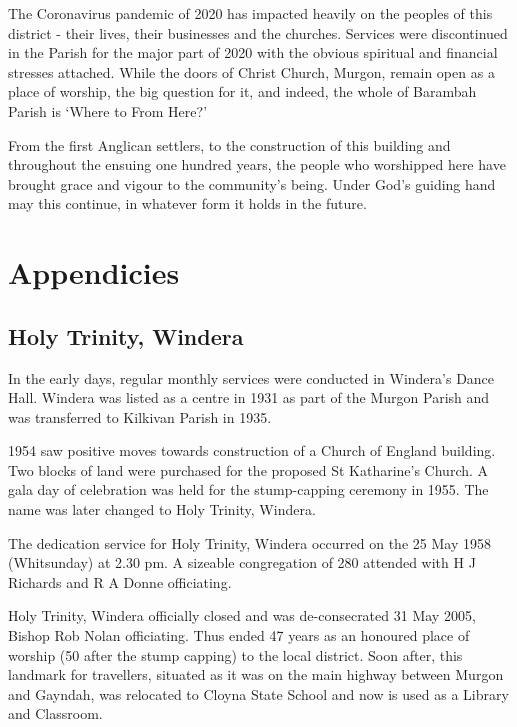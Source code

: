 The Coronavirus pandemic of 2020 has impacted heavily on the peoples of this district - their lives, their businesses and the churches. Services were discontinued in the Parish for the major part of 2020 with the obvious spiritual and financial stresses attached. While the doors of Christ Church, Murgon, remain open as a place of worship, the big question for it, and indeed, the whole of Barambah Parish is `Where to From Here?'



From the first Anglican settlers, to the construction of this building and throughout the ensuing one hundred years, the people who worshipped here have brought grace and vigour to the community's being. Under God's guiding hand may this continue, in whatever form it holds in the future.



\backmatter
\chapter{Appendicies}
\nobalance


\section{Holy Trinity, Windera}



In the early days, regular monthly services were conducted in Windera's Dance Hall. Windera was listed as a centre in 1931 as part of the Murgon Parish and was transferred to Kilkivan Parish in 1935.



1954 saw positive moves towards construction of a Church of England building. Two blocks of land were purchased for the proposed St Katharine's Church. A gala day of celebration was held for the stump-capping ceremony in 1955. The name was later changed to Holy Trinity, Windera.



The dedication service for Holy Trinity, Windera occurred on the 25 May 1958 (Whitsunday) at 2.30 pm. A sizeable congregation of 280 attended with H J Richards and R A Donne officiating.



Holy Trinity, Windera officially closed and was de-consecrated 31 May 2005, Bishop Rob Nolan officiating. Thus ended 47 years as an honoured place of worship (50 after the stump capping) to the local district. Soon after, this landmark for travellers, situated as it was on the main highway between Murgon and Gayndah, was relocated to Cloyna State School and now is used as a Library and Classroom.



